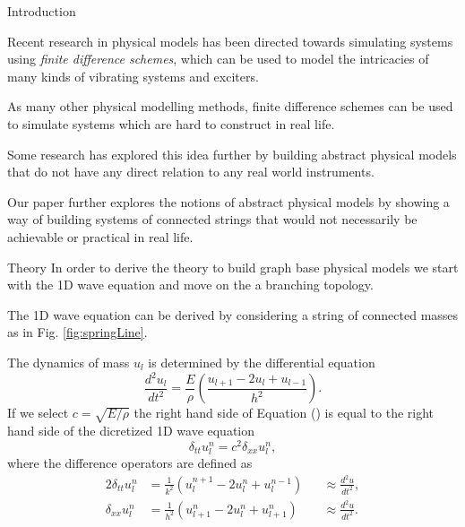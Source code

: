 \documentclass[a0paper,portrait]{baposter}
\begin{document}
\begin{poster}

\begin{posterbox}[name=intro,column=0,row=0]{Introduction}

Recent research in physical models has been directed towards simulating systems using \textit{finite difference schemes}\cite{numericalSoundSynthesis}, which can be used to model the intricacies of many kinds of vibrating systems and exciters.

As many other physical modelling methods, finite difference schemes can be used to simulate systems which are hard to construct in real life.

Some research has explored this idea further by building abstract physical models that do not have any direct relation to any real world instruments. 

Our paper further explores the notions of abstract physical models by
showing a way of building systems of connected strings that would not necessarily be achievable or practical in real life.

\end{posterbox}

\begin{posterbox}[name=usage,column=0,below=intro]{Theory}
In order to derive the theory to build graph base physical models we start with the 1D wave equation and move on the a branching topology.
    
The 1D wave equation can be derived by considering a string of connected masses as in Fig. \ref{fig:springLine}.  
\begin{center}
    {
        
    }
    \label{fig:springLine}
\end{center}

The dynamics of mass $u_l$ is determined by the differential equation
\begin{equation}
    \label{eq:linePhys}
    \frac{d^2u_l}{dt^2} = \frac{E}{\rho}\left(\frac{u_{l+1} - 2u_{l} + u_{l-1}}{h^2} \right).
\end{equation}
If we select $c = \sqrt{E / \rho}$ the right hand side of Equation
(\label{eq:linePhys}) is equal to the right hand side of the dicretized 1D
wave equation
\begin{equation}
    \label{eq:discretized1dWave}
    \delta_{tt} u^{n}_{l} = c^2 \delta_{xx} u^{n}_{l},
\end{equation}
where the difference operators are defined as
\begin{alignat}{2}
\delta_{tt} u^n_l &= \frac{1}{k^2}(u^{n+1}_l - 2u^n_l + u^{n-1}_l)   &&\approx \frac{d^2u}{dt^2}, \\
\label{eq:secondOrderDiff}
\delta_{xx} u^{n}_{l} &= \frac{1}{h^2}(u^{n}_{l+1} - 2u^{n}_{ l} + u^{n}_{ l+1}) &&\approx \frac{d^2u}{dt^2}.
\end{alignat}
\vfill
\end{posterbox}


\end{poster}
\end{document}
